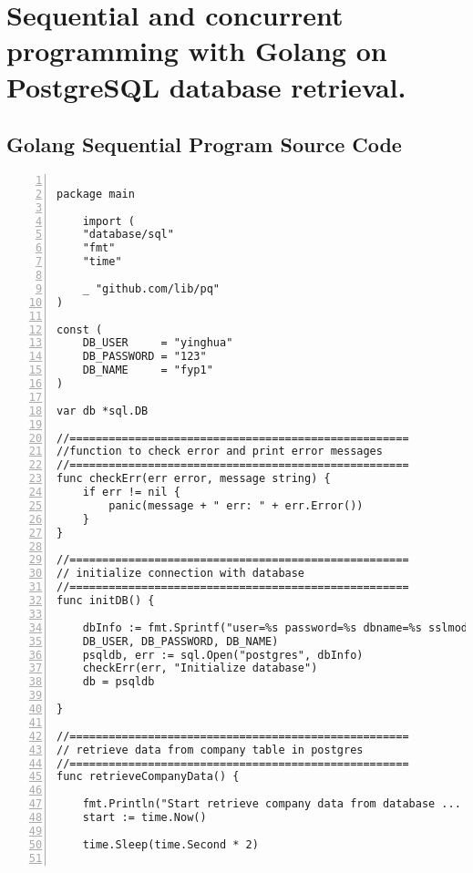 \chapter{Sequential and concurrent programming with Golang on PostgreSQL database retrieval.} 
\label{AppendixD} 


\section {Golang Sequential Program Source Code}

\lstset{basicstyle=\ttfamily\tiny}  
\begin{lstlisting}[breaklines, frame=single, numbers=left, caption={Golang Sequential Program Source Code}, label=commandline-02]

package main

	import (
	"database/sql"
	"fmt"
	"time"
	
	_ "github.com/lib/pq"
)

const (
	DB_USER     = "yinghua"
	DB_PASSWORD = "123"
	DB_NAME     = "fyp1"
)

var db *sql.DB

//====================================================
//function to check error and print error messages
//====================================================
func checkErr(err error, message string) {
	if err != nil {
		panic(message + " err: " + err.Error())
	}
}

//====================================================
// initialize connection with database
//====================================================
func initDB() {

	dbInfo := fmt.Sprintf("user=%s password=%s dbname=%s sslmode=disable",
	DB_USER, DB_PASSWORD, DB_NAME)
	psqldb, err := sql.Open("postgres", dbInfo)
	checkErr(err, "Initialize database")
	db = psqldb

}

//====================================================
// retrieve data from company table in postgres
//====================================================
func retrieveCompanyData() {

	fmt.Println("Start retrieve company data from database ... ")
	start := time.Now()
	
	time.Sleep(time.Second * 2)
	

\end{lstlisting}
